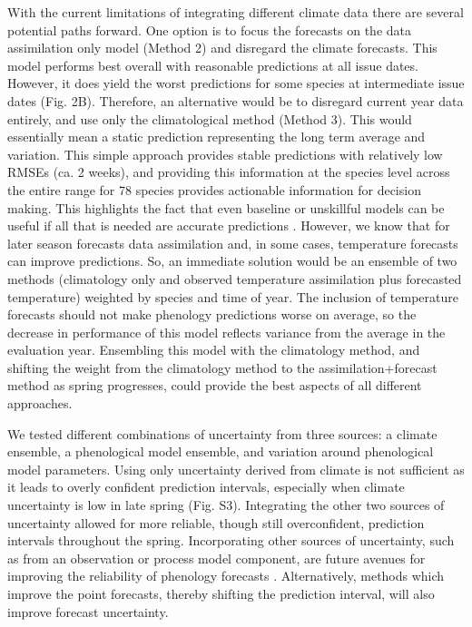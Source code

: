 \documentclass[fleqn,10pt,lineno]{wlpeerj}
\begin{document}
With the current limitations of integrating different climate data there are several potential paths forward. One option is to focus the forecasts on the data assimilation only model (Method 2) and disregard the climate forecasts. This model performs best overall with reasonable predictions at all issue dates. However, it does yield the worst predictions for some species at intermediate issue dates (Fig. 2B). Therefore, an alternative would be to disregard current year data entirely, and use only the climatological method (Method 3). This would essentially mean a static prediction representing the long term average and variation. This simple approach provides stable predictions with relatively low RMSEs (ca. 2 weeks), and providing this information at the species level across the entire range for 78 species provides actionable information for decision making. This highlights the fact that even baseline or unskillful models can be useful if all that is needed are accurate predictions \citep{harris2018}. However, we know that for later season forecasts data assimilation and, in some cases, temperature forecasts can improve predictions. So, an immediate solution would be an ensemble of two methods (climatology only and observed temperature assimilation plus forecasted temperature) weighted by species and time of year. The inclusion of temperature forecasts should not make phenology predictions worse on average, so the decrease in performance of this model reflects variance from the average in the evaluation year. Ensembling this model with the climatology method, and shifting the weight from the climatology method to the assimilation+forecast method as spring progresses, could provide the best aspects of all different approaches.

We tested different combinations of uncertainty from three sources: a climate ensemble, a phenological model ensemble, and variation around phenological model parameters. Using only uncertainty derived from climate is not sufficient as it leads to overly confident prediction intervals, especially when climate uncertainty is low in late spring (Fig. S3). Integrating the other two sources of uncertainty allowed for more reliable, though still overconfident, prediction intervals throughout the spring. Incorporating other sources of uncertainty, such as from an observation or process model component, are future avenues for improving the reliability of phenology forecasts \citep{dietze2017}. Alternatively, methods which improve the point forecasts, thereby shifting the prediction interval, will also improve forecast uncertainty. 
\end{document}
